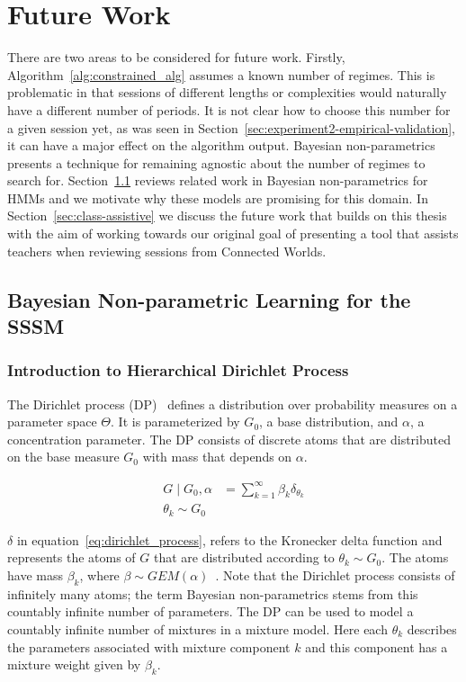 \section{Future Work}
There are two areas to be considered for future work. Firstly, Algorithm~\ref{alg:constrained_alg} assumes a known number of regimes. This is problematic in that sessions of different lengths or complexities would naturally have a different number of periods. It is not clear how to choose this number for a given session yet, as was seen in Section~\ref{sec:experiment2-empirical-validation}, it can have a major effect on the algorithm output. Bayesian non-parametrics presents a technique for remaining agnostic about the number of regimes to search for. Section~\ref{sec:non-parameteric} reviews related work in Bayesian non-parametrics for HMMs and we motivate why these models are promising for this domain. In Section~\ref{sec:class-assistive} we discuss the future work that builds on this thesis with the aim of working towards our original goal of presenting a tool that assists teachers when reviewing sessions from Connected Worlds.

\subsection{Bayesian Non-parametric Learning for the SSSM}\label{sec:non-parameteric}
\subsubsection{Introduction to Hierarchical Dirichlet Process}
The Dirichlet process (DP)~\citep{ferguson1973bayesian} defines a distribution over probability measures on a parameter space $\Theta$. It is parameterized by $G_0$, a base distribution, and $\alpha$, a concentration parameter. The DP consists of discrete atoms that are distributed on the base measure $G_0$ with mass that depends on $\alpha$.

\begin{equation}\label{eq:dirichlet_process}
  \begin{split}
    G \mid G_0, \alpha &= \sum\limits_{k=1}^{\infty} \beta_k \delta_{\theta_k} \\
    \theta_k \sim G_0
  \end{split}
\end{equation}

$\delta$ in equation~\ref{eq:dirichlet_process}, refers to the Kronecker delta function and represents the atoms of $G$ that are distributed according to $\theta_k \sim G_0$. The atoms have mass $\beta_k$, where $\beta \sim GEM(\alpha)$~\citep{neal2000markov}. Note that the Dirichlet process consists of infinitely many atoms; the term Bayesian non-parametrics stems from this countably infinite number of parameters. The DP can be used to model a countably infinite number of mixtures in a mixture model. Here each $\theta_k$ describes the parameters associated with mixture component $k$ and this component has a mixture weight given by $\beta_k$.

